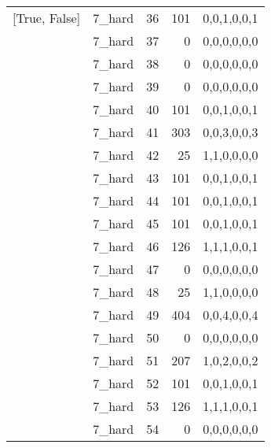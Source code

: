 \begin{tabular}{llrrl}
 [True, False]   & 7\_hard              &            36 &                   101 & 0,0,1,0,0,1   \\
 [True, False]   & 7\_hard              &            37 &                     0 & 0,0,0,0,0,0   \\
 [True, False]   & 7\_hard              &            38 &                     0 & 0,0,0,0,0,0   \\
 [True, False]   & 7\_hard              &            39 &                     0 & 0,0,0,0,0,0   \\
 [True, False]   & 7\_hard              &            40 &                   101 & 0,0,1,0,0,1   \\
 [True, False]   & 7\_hard              &            41 &                   303 & 0,0,3,0,0,3   \\
 [True, False]   & 7\_hard              &            42 &                    25 & 1,1,0,0,0,0   \\
 [True, False]   & 7\_hard              &            43 &                   101 & 0,0,1,0,0,1   \\
 [True, False]   & 7\_hard              &            44 &                   101 & 0,0,1,0,0,1   \\
 [True, False]   & 7\_hard              &            45 &                   101 & 0,0,1,0,0,1   \\
 [True, False]   & 7\_hard              &            46 &                   126 & 1,1,1,0,0,1   \\
 [True, False]   & 7\_hard              &            47 &                     0 & 0,0,0,0,0,0   \\
 [True, False]   & 7\_hard              &            48 &                    25 & 1,1,0,0,0,0   \\
 [True, False]   & 7\_hard              &            49 &                   404 & 0,0,4,0,0,4   \\
 [True, False]   & 7\_hard              &            50 &                     0 & 0,0,0,0,0,0   \\
 [True, False]   & 7\_hard              &            51 &                   207 & 1,0,2,0,0,2   \\
 [True, False]   & 7\_hard              &            52 &                   101 & 0,0,1,0,0,1   \\
 [True, False]   & 7\_hard              &            53 &                   126 & 1,1,1,0,0,1   \\
 [True, False]   & 7\_hard              &            54 &                     0 & 0,0,0,0,0,0   \\

\end{tabular}
